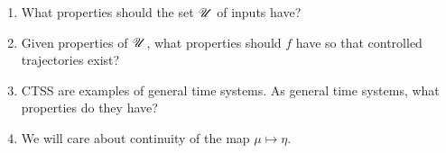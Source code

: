 \begin{question}
	\begin{enumerate}
		\item What properties should the set $\mathscr{U}$ of inputs have?
		\item Given properties of $\mathscr{U}$, what properties should $f $ have so that controlled trajectories exist?
		\item CTSS are examples of general time systems. As general time systems, what properties do they have? 
		\item We will care about continuity of the map $\mu \longmapsto \eta$. 

	\end{enumerate}
\end{question}
